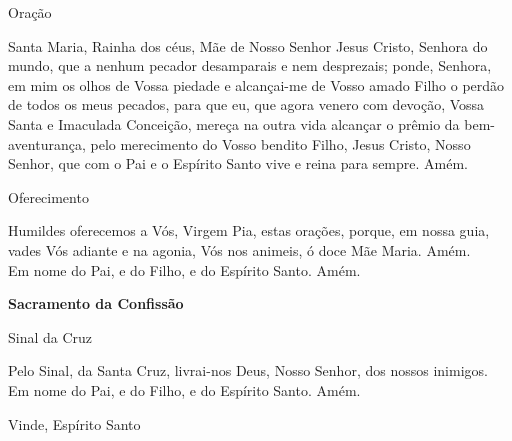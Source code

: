 \documentclass{book}
\begin{document}
\begin{center}
    \textcolor{VioletRed2}{Oração}
\end{center}
\begin{flushleft}
    Santa Maria, Rainha dos céus, Mãe de Nosso Senhor Jesus Cristo, Senhora do mundo, que a nenhum pecador desamparais e nem desprezais; ponde, Senhora, em mim os olhos de Vossa piedade e alcançai-me de Vosso amado Filho o perdão de todos os meus pecados, para que eu, que agora venero com devoção, Vossa Santa e Imaculada Conceição, mereça na outra vida alcançar o prêmio da bem-aventurança, pelo merecimento do Vosso bendito Filho, Jesus Cristo, Nosso Senhor, que com o Pai e o Espírito Santo vive e reina para sempre. Amém.
\end{flushleft}
\begin{center}
    \textcolor{VioletRed2}{Oferecimento}
\end{center}
\begin{flushleft}
    Humildes oferecemos a Vós, Virgem Pia, estas orações, porque, em nossa guia, vades Vós adiante e na agonia, Vós nos animeis, ó doce Mãe Maria. Amém.
    \vspace{.2cm} \\
    Em nome do Pai, \grecrossRed{} e do Filho, e do Espírito Santo. Amém.
\end{flushleft}
\newpage
\begin{center}
    \textbf{Sacramento da Confissão}
\end{center}
\begin{center}
    Sinal da Cruz
\end{center}
\begin{flushleft}
    Pelo Sinal, \grecrossRed{} da Santa Cruz, livrai-nos Deus, \grecrossRed{} Nosso Senhor, dos nossos \grecrossRed{} inimigos. Em nome do Pai, \grecrossRed{} e do Filho, e do Espírito Santo. Amém.
\end{flushleft}
\begin{center}
    Vinde, Espírito Santo
\end{center}
\end{document}
